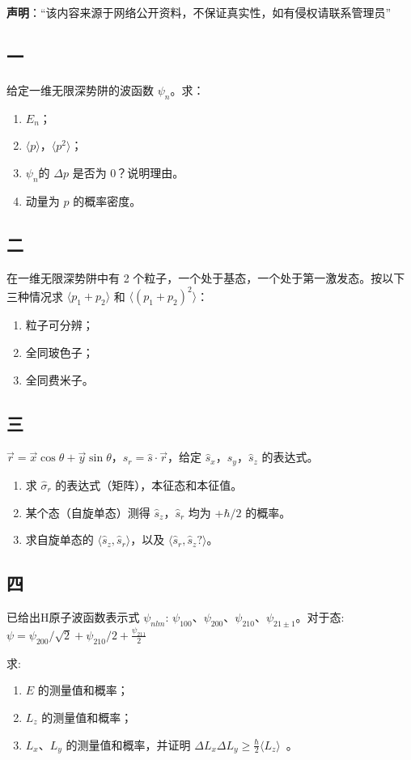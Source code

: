 
\textbf{声明}：“该内容来源于网络公开资料，不保证真实性，如有侵权请联系管理员”

\subsection{一}
给定一维无限深势阱的波函数 $\psi_n$。求：
\begin{enumerate}
    \item $E_n$；
    \item $\langle p \rangle$，$\langle p^2 \rangle$；
    \item $\psi_n$的 $\Delta p$ 是否为 0？说明理由。
    \item 动量为 $p$ 的概率密度。
\end{enumerate}
\subsection{二}
在一维无限深势阱中有 2 个粒子，一个处于基态，一个处于第一激发态。按以下三种情况求 $\langle p_1 + p_2 \rangle$ 和 $\langle (p_1 + p_2)^2 \rangle$：
\begin{enumerate}
    \item 粒子可分辨；
    \item 全同玻色子；
    \item 全同费米子。
\end{enumerate}
\subsection{三}
$\vec{r} = \vec{x} \cos \theta + \vec{y} \sin \theta$，$\hat s_r = \hat{s} \cdot \vec{r}$，给定 $\hat s_x$，$\hat s_y$，$\hat s_z$ 的表达式。
\begin{enumerate}
    \item 求 $ \hat\sigma_r$ 的表达式（矩阵），本征态和本征值。
    \item 某个态（自旋单态）测得 $\hat s_z$，$\hat s_r$ 均为 +$\hbar/2$ 的概率。
    \item 求自旋单态的 $\langle \hat s_z ,\hat s_r \rangle$，以及 $\langle \hat s_r ,\hat s_z ?\rangle$。
\end{enumerate}
\subsection{四}
已给出H原子波函数表示式 $\psi_{nlm}$: $\psi_{100}$、$\psi_{200}$、$\psi_{210}$、$\psi_{21\pm 1}$。对于态:
$\psi = \psi_{200}/\sqrt{2} + \psi_{210}/{2} + \frac{\psi_{211}}{2}
$

求:
\begin{enumerate}
    \item $E$ 的测量值和概率；
    \item $L_z$ 的测量值和概率；
    \item $L_x$、$L_y$ 的测量值和概率，并证明 $\Delta L_x \Delta L_y \geq \frac{\hbar}{2} \langle L_z \rangle$~。
\end{enumerate}
